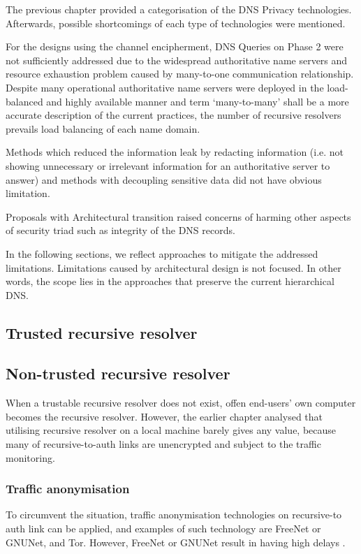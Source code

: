 The previous chapter provided a categorisation of the DNS Privacy technologies.
Afterwards, possible shortcomings of each type of technologies were mentioned.

For the designs using the channel encipherment, DNS Queries on Phase 2 were not sufficiently addressed due to the widespread authoritative name servers and resource exhaustion problem caused by many-to-one communication relationship.
Despite many operational authoritative name servers were deployed in the load-balanced and highly available manner and term `many-to-many' shall be a more accurate description of the current practices, the number of recursive resolvers prevails load balancing of each name domain.

Methods which reduced the information leak by redacting information (i.e. not showing unnecessary or irrelevant information for an authoritative server to answer) and methods with decoupling sensitive data did not have obvious limitation.

Proposals with Architectural transition raised concerns of harming other aspects of security triad such as integrity of the DNS records.

In the following sections, we reflect approaches to mitigate the addressed limitations. Limitations caused by architectural design is not focused. In other words, the scope lies in the approaches that preserve the current hierarchical DNS.

\subsection{Trusted recursive resolver}

\subsection{Non-trusted recursive resolver}
When a trustable recursive resolver does not exist, offen end-users' own computer becomes the recursive resolver. However, the earlier chapter analysed that utilising recursive resolver on a local machine barely gives any value, because many of recursive-to-auth links are unencrypted and subject to the traffic monitoring.

\subsubsection{Traffic anonymisation}
To circumvent the situation, traffic anonymisation technologies on recursive-to auth link can be applied, and examples of such technology are  FreeNet \cite{clarke2001freenet} or GNUNet\cite{grothoff2017gnunet}, and Tor.
However, FreeNet \cite{clarke2001freenet} or GNUNet \cite{grothoff2017gnunet} result in having high delays \cite{anonymousoverdns}.

